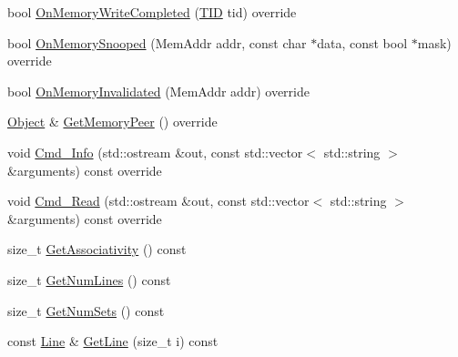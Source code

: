 \begin{DoxyCompactItemize}
\item 
bool \hyperlink{class_simulator_1_1drisc_1_1_d_cache_a5f642cb471c08f5056f7bc3a93b8312d}{On\+Memory\+Write\+Completed} (\hyperlink{namespace_simulator_a483cc4ecee1736e895054617672cded5}{T\+I\+D} tid) override
\item 
bool \hyperlink{class_simulator_1_1drisc_1_1_d_cache_a8229d5f73ccd678b27b2086168620f79}{On\+Memory\+Snooped} (Mem\+Addr addr, const char $\ast$data, const bool $\ast$mask) override
\item 
bool \hyperlink{class_simulator_1_1drisc_1_1_d_cache_a583fdc1194fffefec8a12bcbc32e2fc3}{On\+Memory\+Invalidated} (Mem\+Addr addr) override
\item 
\hyperlink{class_simulator_1_1_object}{Object} \& \hyperlink{class_simulator_1_1drisc_1_1_d_cache_a0ee619a4930f7b92e450fc1b6f9c08cd}{Get\+Memory\+Peer} () override
\item 
void \hyperlink{class_simulator_1_1drisc_1_1_d_cache_a9097106ad74a2a9198ce9caee47420cb}{Cmd\+\_\+\+Info} (std\+::ostream \&out, const std\+::vector$<$ std\+::string $>$ \&arguments) const override
\item 
void \hyperlink{class_simulator_1_1drisc_1_1_d_cache_af68d132ebce737293e3678dcfa3b9fd8}{Cmd\+\_\+\+Read} (std\+::ostream \&out, const std\+::vector$<$ std\+::string $>$ \&arguments) const override
\item 
size\+\_\+t \hyperlink{class_simulator_1_1drisc_1_1_d_cache_a0ab8548e496232a709b8c2a006be6aaa}{Get\+Associativity} () const 
\item 
size\+\_\+t \hyperlink{class_simulator_1_1drisc_1_1_d_cache_a7beb41cf505c2764e5da68d1ebc93794}{Get\+Num\+Lines} () const 
\item 
size\+\_\+t \hyperlink{class_simulator_1_1drisc_1_1_d_cache_a45b14a4aad78c53e1d2a5f13f3e58cff}{Get\+Num\+Sets} () const 
\item 
const \hyperlink{struct_simulator_1_1drisc_1_1_d_cache_1_1_line}{Line} \& \hyperlink{class_simulator_1_1drisc_1_1_d_cache_ac25b28535cc1742c7153995882c8f284}{Get\+Line} (size\+\_\+t i) const 
\end{DoxyCompactItemize}

